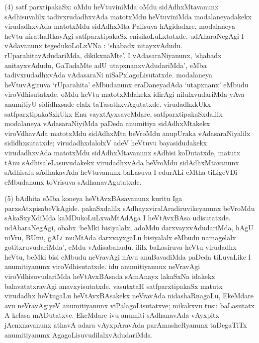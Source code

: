 (4) satf parxtipakaSx: oMdu heVtuviniMda oMdu sidAdhxMtavanunx sAdhisuvalilx tadivx\-rudadhxvAda matotxMdu heVtuviniMda modalaneyadakekx virudadhxvAda matotxMdu sidAdhxMta Palisuva hAgidadxre, modalaneya heVtu nirathaRkavAgi satfparxtipakaSx enisi\-koLuLxtatxde. udAharaNegAgi I vAdavanunx tegedukoLoLxVNa : `shabadx nitayxvAdudu. rUparahitavAdudariMda, dikikxnaMte'. I vAdasaraNiyanunx, `shabadx anitayxvAdudu, GaTadaMte adU utapxnanxvAdudariMda', eMba tadivxrudadhxvAda vAdasaraNi niSaPxla\-goLisutatxde. modalaneya heVtuvAgiruva `rUparahita' eMbudanunx eraDaneyadAda \hbox{`utapxnanx'} eMbudu viroVdhisutatxde. oMdu heVtu matotxMdakekx idirAgi nilulxvudariMda yAva anumitiyU sididhxsade elalx taTasathxvAgutatxde. virudadhxkUkx satfparxtipakaSxkUkx Enu vayxtAyxsa\-veMdare, satfparxtipakaSxdalilx modalaneya vAdasaraNiyiMda paDeda anumitiya sidAdhxM\-takekx viroVdhavAda matotxMdu sidAdhxMta beVroMdu anupUraka vAdasaraNiyalilx sididhx\-sutatxde; virudadhxdalolxV adeV heVtuvu bayasidudakekx virudadhxvAda matotxMdu sidAdhxMta\-vanunx sAdhisi koDutatxde, matutx tAnu sAdhisaleLasuvudakekx virudadhxvAda beVroMdu sidAdhxMtavanunx sAdhisalu sAdhakavAda heVtuvanunx baLasuva I edurALi eMtha tiLigeVDi eMbudanunx toVrisuva sAdhanavAgutatxde.

(5) bAdhita eMba koneya heVtAvxBAsavanunx kuritu Iga parxsAtxpisabeVkAgide. pakaSxdalilx sAdhayxviralAradiruvikeyanunx beVroMdu sAkaSxyXdiMda kaMDukoLuLxvaMtAdAga I heVtAvxBAsa udisutatxde. udAharaNegAgi, obabx `beMki bisiyalalx, adoMdu darxvayx\-vAdudariMda, hAgU niVru, BUmi, gALi muMtAda darxvayxgaLu bisiyalalx eMbudu namagelalx gotitxruvudariMda', eMdu vAdisabahudu. ililx baLasiruva heVtu \hbox{virudadhx} heVtu, beMki bisi eMbudu neVravAgi nAvu anuBavadiMda paDeda tiLuvaLike I anu\-mitiyanunx viroVdhisutatxde. idu anumitiyanunx neVravAgi viroVdhisuvu\-dariMda heVtAvxBAsada sAmAnayx lakaSxNa idakekx balavatatxravAgi anavxyisutatxde. vasutxtaH satf\-parxtipakaSx matutx virudadhx heVtugaLu heVtAvxBAsakekx neVravAda nidashaRnagaLu, EkeMdare avu neVra\-vAgiyeV anumitiyanunx viPalagoLisutatxve; mikakxvu tusu baLasutatx A kelasa mADu\-tatxve. EkeMdare ivu anumiti sAdhanavAda vAyxpitx jAcnxnavanunx athavA adara vAyxpAra\-vAda parAmasheRyanunx taDegaTiTx anumitiyanunx AgagoLisuvudilalxvAdudariMda.

